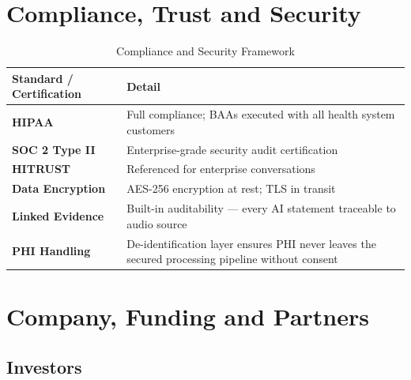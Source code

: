 \documentclass[12pt,a4paper]{article}
\begin{document}
\newpage

\section{Compliance, Trust and Security}

\begin{table}[H]
\centering
\renewcommand{\arraystretch}{1.4}
\begin{tabularx}{\textwidth}{lX}
\toprule
\textbf{Standard / Certification} & \textbf{Detail} \\
\midrule
\textbf{HIPAA} & Full compliance; BAAs executed with all health system customers \\
\textbf{SOC 2 Type II} & Enterprise-grade security audit certification \\
\textbf{HITRUST} & Referenced for enterprise conversations \\
\textbf{Data Encryption} & AES-256 encryption at rest; TLS in transit \\
\textbf{Linked Evidence} & Built-in auditability --- every AI statement traceable to audio source \\
\textbf{PHI Handling} & De-identification layer ensures PHI never leaves the secured processing pipeline without consent \\
\bottomrule
\end{tabularx}
\caption{Compliance and Security Framework}
\end{table}

\newpage

\section{Company, Funding and Partners}

\subsection{Investors}
\end{document}

